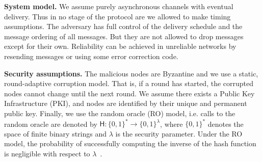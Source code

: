 \textbf{System model.}
We assume purely asynchronous channels with eventual delivery.
Thus in no stage of the protocol are we allowed to make timing assumptions.
The adversary has full control of the delivery schedule and the message ordering of all messages.
But they are not allowed to drop messages except for their own.
Reliability can be achieved in unreliable networks by resending messages or using some error correction code.

\textbf{Security assumptions.}
The malicious nodes are Byzantine and we use a static, round-adaptive corruption model.
That is, if a round has started, the corrupted nodes cannot change until the next round.
We assume there exists a Public Key Infrastructure (PKI), and nodes are identified by their unique and permanent public key.
Finally, we use the random oracle (RO) model, i.e. calls to the random oracle are denoted by $\textsf{H}: \{0, 1\}^* \rightarrow \{0, 1\}^\lambda$,
where $\{0, 1\}^*$ denotes the space of finite binary strings and $\lambda$ is the security parameter.
Under the RO model, the probability of successfully computing the inverse of the hash function is negligible with respect to $\lambda$~\cite{bellare1993random}.

